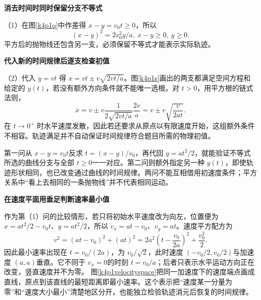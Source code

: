 \begin{solution}\textbf{消去时间时同时保留分支不等式}\par\nobreak
（1）在图\ref{k4p1q}中作差得 $x-y=v_0t\ge0$，所以 \[\boxed{(x-y)^2=2v_0^2y/a,\ x-y\ge0,\ y\ge0}.\]平方后的抛物线还包含另一支，必须保留不等式才能表示实际轨迹。



\par\medskip{}\noindent\textbf{代入新的时间规律后逐支检查初值}\par\nobreak
（2）代入 $y=vt$ 得 $\boxed{x=vt\pm v\sqrt{2vt/a}}$。图\ref{k4p1s}画出的两支都满足空间方程和给定的 $y(t)$，若没有额外方向条件就不能唯一选根。对 $t>0$，用平方根的链式法则，
\[\dot x=v\pm v\frac{1}{2\sqrt{2vt/a}}\frac{2v}{a}
 =v\pm v\sqrt{\frac{v}{2at}}.\]
在 $t\to0^+$ 时水平速度发散，因此若还要求从原点以有限速度开始，这组额外条件不相容。轨迹满足并不自动保证时间规律符合题目所需的物理初值。

第一问从 $x-y=v_0t$反求 $t=(x-y)/v_0$，再代回 $y=at^2/2$，就能验证不等式所选的曲线分支与全部 $t\ge0$一一对应。第二问则额外指定另一种 $y(t)$，即使轨迹形状相同，也已改变通过曲线的时间规律。两问不能互相借用初速度条件；平方关系中“看上去相同的一条抛物线”并不代表相同运动。



\par\medskip{}\noindent\textbf{在速度平面用垂足判断速率最小值}\par\nobreak
作为第（1）问的比较情形，若只将初始水平速度改为向左，位置便为 $x=at^2/2-v_0t$、$y=at^2/2$，所以 $v_x=at-v_0$、$v_y=at$。速度平方配方为
\[v^2=(at-v_0)^2+(at)^2
 =2a^2\left(t-\frac{v_0}{2a}\right)^2+\frac{v_0^2}{2}.\]
因此最小速率出现在 $t=v_0/(2a)$，为 $v_0/\sqrt2$，此时速度 $(-v_0/2,v_0/2)$与加速度 $(a,a)$垂直。它不同于 $v_x=0$的时刻 $t=v_0/a$；后者只表示水平运动方向正在改变，竖直速度并不为零。
图\ref{k4p1velocityspace}把同一加速度下的速度端点画成直线，原点到该直线的最短距离即最小速率。这个表示把“速度某一分量为零”和“速度大小最小”清楚地区分开，也能独立检验轨迹消元后恢复的时间规律。
\end{solution}

